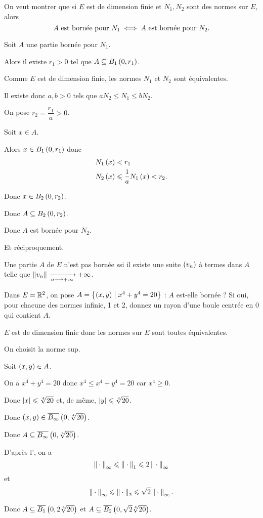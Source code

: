 \begin{corr}
On veut montrer que si \(E\) est de dimension finie et \(N_1,N_2\) sont des normes sur \(E\), alors \[A\text{ est bornée pour }N_1\iff A\text{ est bornée pour }N_2.\]

Soit \(A\) une partie bornée pour \(N_1\).

Alors il existe \(r_1>0\) tel que \(A\subset\bouleo[1]{0}{r_1}\).

Comme \(E\) est de dimension finie, les normes \(N_1\) et \(N_2\) sont équivalentes.

Il existe donc \(a,b>0\) tels que \(aN_2\leq N_1\leq bN_2\).

On pose \(r_2=\dfrac{r_1}{a}>0\).

Soit \(x\in A\).

Alors \(x\in\bouleo[1]{0}{r_1}\) donc \[\begin{aligned}
N_1\left(x\right)&<r_1 \\
N_2\left(x\right)&\leqslant\dfrac{1}{a}N_1\left(x\right)<r_2.
\end{aligned}\]

Donc \(x\in\bouleo[2]{0}{r_2}\).

Donc \(A\subset\bouleo[2]{0}{r_2}\).

Donc \(A\) est bornée pour \(N_2\).

Et réciproquement.
\end{corr}

\begin{prop}
Une partie \(A\) de \(E\) n'est pas bornée ssi il existe une suite \(\left(v_n\right)\) à termes dans \(A\) telle que \(\norme{v_n}\tendqd{n\to\pinf}\pinf\).
\end{prop}

\begin{exo}
Dans \(E=\mathbb{R}^2\), on pose \(A=\left\lbrace\left(x,y\right)\;\middle|\; x^4+y^4=20\right\rbrace\) : \(A\) est-elle bornée ? Si oui, pour chacune des normes infinie, 1 et 2, donnez un rayon d'une boule centrée en \(0\) qui contient \(A\).
\end{exo}

\begin{corr}
\(E\) est de dimension finie donc les normes sur \(E\) sont toutes équivalentes.

On choisit la norme sup.

Soit \(\left(x,y\right)\in A\).

On a \(x^4+y^4=20\) donc \(x^4\leq x^4+y^4=20\) car \(x^4\geq0\).

Donc \(\left\lvert x\right\rvert\leqslant\sqrt[4]{20}\) et, de même, \(\left\lvert y\right\rvert\leqslant\sqrt[4]{20}\).

Donc \(\paren{x,y}\in\boulef[\infty]{0}{\sqrt[4]{20}}\).

Donc \(A\subset\boulef[\infty]{0}{\sqrt[4]{20}}\).

D'après l', on a \[\norme{}_\infty\leq\norme{}_1\leq2\norme{}_\infty\] et \[\norme{}_\infty\leq\norme{}_2\leq\sqrt{2}\norme{}_\infty.\]

Donc \(A\subset\boulef[1]{0}{2\sqrt[4]{20}}\) et \(A\subset\boulef[2]{0}{\sqrt{2}\sqrt[4]{20}}\).
\end{corr}


